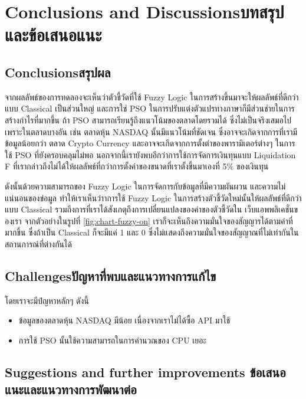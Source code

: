 \chapter{\ifenglish Conclusions and Discussions\else บทสรุปและข้อเสนอแนะ\fi}

\section{\ifenglish Conclusions\else สรุปผล\fi}


จากผลลัพธ์ของการทดลองจะเห็นว่าตัวชี้วัดที่ใช้ Fuzzy Logic ในการสร้างขึ้นมาจะให้ผลลัพธ์ที่ดีกว่าแบบ Classical เป็นส่วนใหญ่ และการใช่ PSO ในการปรับแต่งตัวแปรทางภาษาก็มีส่วนช่ายในการสร้างกำไรที่มากขึ้น ถ้า PSO สามารถเรียนรู้ถึงแนวโน้มของตลาดโดยรวมได้ ซึ่งไม่เป็นจริงเสมอไป เพราะในตลาดบางอัน เช่น ตลาดหุ้น NASDAQ นั้นมีแนวโน้มที่ชัดเจน ซึ่งอาจจะเกิดจากการที่เรามีข้อมูลน้อยกว่า ตลาด Crypto Currency และอาจจะเกิดจากการตั้งต่าของพารามิเตอร์ต่างๆ ในการใช้ PSO ที่ยังครอบคลุมไม่พอ นอกจากนี้เรายังพบอีกว่าการใช้การจัดการเงินทุนแบบ Liquidation F ที่เรากล่าวถึงไม่ได้ให้ผลลัพธ์ที่กว่าการตั้งค่าของขนาดที่เราตั้งขึ้นมาเองที่ 5\% ของเงินทุน 

ดังนั้นด้วยความสามารถของ Fuzzy Logic ในการจัดการกับข้อมูลที่มีความผันผวน และความไม่แน่นอนของข่อมูล ทำให้เราเห็นว่าาการใช้ Fuzzy
Logic ในการสร้างตัวชี้วัดใหม่นั้นให้ผลลัพธ์ที่ดีกว่าแบบ Classical รวมถึงการที่เราได้สังเกตุถึงการเปลี่ยนแปลงของค่าของตัวชี้วัดใน เว็บแอพพลิเคชั่นของเรา จากตัวอย่างในรูปที่ \ref{fig:chart-fuzzy-on} เราก็จะเห็นถึงความมั่นใจของสัญญารได้ตามค่าที่มากขึ้น ซึ่งถ้าเป็น Classical ก็จะมีแค่ 1 และ 0 ซึ่งไม่แสดงถึงความมั่นใจของสัญญาณที่ไม่เท่ากันในสถานการณ์ที่ต่างกันได้

\section{\ifenglish Challenges\else ปัญหาที่พบและแนวทางการแก้ไข\fi}
โดยเราจะมีปํญหาหลักๆ ดังนี้
\begin{itemize}
    \item ข้อมูลของตลาดหุ้น NASDAQ มีน้อย เนื่องจากเราไม่ได้ซื้อ API มาใช้
    \item การใช้ PSO นั้นใช้ความสามารถในการคำนวณของ CPU เยอะ
\end{itemize}

\section{\ifenglish%
Suggestions and further improvements
\else%
ข้อเสนอแนะและแนวทางการพัฒนาต่อ
\fi
}

